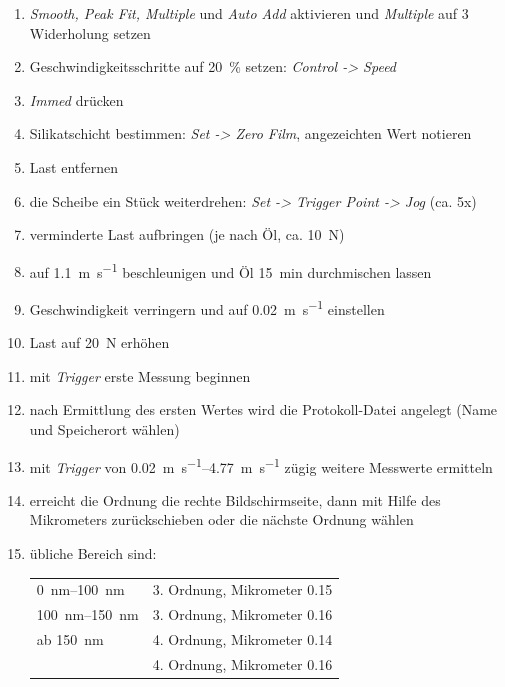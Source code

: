 \begin{appendices}
\begin{enumerate}
            \item \textit{Smooth, Peak Fit, Multiple} und \textit{Auto Add} aktivieren und \textit{Multiple} auf \num{3} Widerholung setzen
            \item Geschwindigkeitsschritte auf \SI{20}{\percent} setzen: \textit{Control -> Speed}
            \item \textit{Immed} drücken
            \item Silikatschicht bestimmen: \textit{Set -> Zero Film}, angezeichten Wert notieren
            \item Last entfernen
            \item die Scheibe ein Stück weiterdrehen: \textit{Set -> Trigger Point -> Jog} (ca. 5x)
            \item verminderte Last aufbringen (je nach Öl, ca. \SI{10}{\newton})
            \item auf \SI[per-mode=symbol]{1.1}{\meter\per\second} beschleunigen und Öl \SI{15}{\minute} durchmischen lassen
            \item Geschwindigkeit verringern und auf \SI[per-mode=symbol]{0.02}{\meter\per\second} einstellen
            \item Last auf \SI{20}{\newton} erhöhen
            \item mit \textit{Trigger} erste Messung beginnen
            \item nach Ermittlung des ersten Wertes wird die Protokoll-Datei angelegt (Name und Speicherort wählen)
            \item mit \textit{Trigger} von \SIrange[per-mode=symbol]{0.02}{4.77}{\meter\per\second} zügig weitere Messwerte ermitteln
            \item erreicht die Ordnung die rechte Bildschirmseite, dann mit Hilfe des Mikrometers zurückschieben oder die nächste Ordnung wählen
            \item übliche Bereich sind: \\
                \begin{tabular}{ll}
                    \SIrange{0}{100}{\nano\meter}       & 3. Ordnung, Mikrometer \num{0.15} \\
                        \SIrange{100}{150}{\nano\meter} & 3. Ordnung, Mikrometer \num{0.16} \\
                        ab \SI{150}{\nano\meter}        & 4. Ordnung, Mikrometer \num{0.14} \\
                                                        & 4. Ordnung, Mikrometer \num{0.16} \\

\end{tabular}
\end{enumerate}
\end{appendices}

